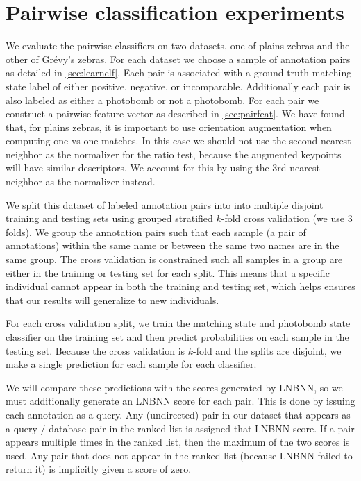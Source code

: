 \section{Pairwise classification experiments}

    We evaluate the pairwise classifiers on two datasets, one of plains zebras
      and the other of Grévy's zebras.
    For each dataset we choose a sample of annotation pairs as detailed in
      \cref{sec:learnclf}.
    Each pair is associated with a ground-truth matching state label of either
      positive, negative, or incomparable.
    Additionally each pair is also labeled as either a photobomb or not a
      photobomb.
    For each pair we construct a pairwise feature vector as described in
      \cref{sec:pairfeat}.
    We have found that, for plains zebras, it is important to use orientation
      augmentation when computing one-vs-one matches.
    In this case we should not use the second nearest neighbor as the
      normalizer for the ratio test, because the augmented keypoints will have
      similar descriptors.
    We account for this by using the 3rd nearest neighbor as the normalizer
      instead.

    We split this dataset of labeled annotation pairs into into multiple
      disjoint training and testing sets using grouped stratified $k$-fold cross
      validation (we use $3$ folds).
    We group the annotation pairs such that each sample (a pair of
      annotations) within the same name or between the same two names are in the
      same group.
    The cross validation is constrained such all samples in a group are either
      in the training or testing set for each split.
    This means that a specific individual cannot appear in both the training
      and testing set, which helps ensures that our results will generalize to
      new individuals.

    For each cross validation split, we train the matching state and photobomb
      state classifier on the training set and then predict probabilities on
      each sample in the testing set.
    Because the cross validation is $k$-fold and the splits are disjoint, we
      make a single prediction for each sample for each classifier.

    We will compare these predictions with the scores generated by LNBNN, so
      we must additionally generate an LNBNN score for each pair.
    This is done by issuing each annotation as a query.
    Any (undirected) pair in our dataset that appears as a query / database
      pair in the ranked list is assigned that LNBNN score.
    If a pair appears multiple times in the ranked list, then the maximum of
      the two scores is used.
    Any pair that does not appear in the ranked list (because LNBNN failed to
      return it) is implicitly given a score of zero.

